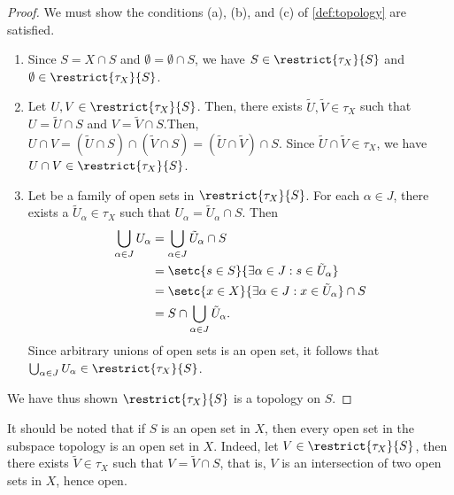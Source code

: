 \begin{proof}
    We must show the conditions (a), (b), and (c) of \cref{def:topology} are satisfied.
    \begin{enumerate}[label=(\alph*)]
        \item Since \(S = X \cap S\) and \(\emptyset = \emptyset \cap S\), we have \(S \in \restrict{\tau_X}{S}\) and \(\emptyset \in \restrict{\tau_X}{S}\).
        \item Let \(U, V \in \restrict{\tau_X}{S}\). Then, there exists \(\tilde{U}, \tilde{V} \in \tau_X\) such that \(U = \tilde{U} \cap S\) and \(V = \tilde{V} \cap S\).Then, \(U \cap V = (\tilde{U}\cap S) \cap (\tilde{V} \cap S) = (\tilde{U}\cap\tilde{V})\cap S\). Since \(\tilde{U} \cap \tilde{V} \in \tau_X\), we have \(U \cap V \in \restrict{\tau_X}{S}\).
        \item Let  be a family of open sets in \(\restrict{\tau_X}{S}\). For each \(\alpha \in J\), there exists a \(\tilde{U}_\alpha\in\tau_X\) such that \(U_\alpha = \tilde{U}_\alpha \cap S\). Then
            \begin{align*}
                \bigcup_{\alpha \in J} U_\alpha &= \bigcup_{\alpha \in J} \tilde{U}_\alpha \cap S\\
                                                &= \setc{s \in S }{\exists \alpha \in J : s \in \tilde{U}_\alpha}\\
                                                &= \setc{x \in X}{\exists \alpha \in J : x \in \tilde{U}_\alpha} \cap S\\
                                                &= S\cap\bigcup_{\alpha\in J}\tilde{U}_\alpha.
            \end{align*}
        Since arbitrary unions of open sets is an open set, it follows that \(\bigcup_{\alpha\in J}U_\alpha \in \restrict{\tau_X}{S}\).
    \end{enumerate}
    We have thus shown \(\restrict{\tau_X}{S}\) is a topology on \(S\).
\end{proof}
\begin{remark}
    It should be noted that if \(S\) is an open set in \(X\), then every open set in the subspace topology is an open set in \(X\). Indeed, let \(V \in \restrict{\tau_X}{S}\), then there exists \(\tilde{V} \in \tau_X\) such that \(V = \tilde{V} \cap S\), that is, \(V\) is an intersection of two open sets in \(X\), hence open.
\end{remark}

